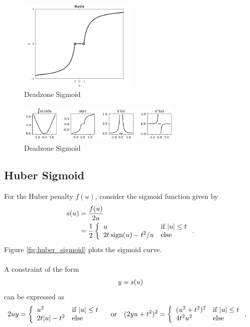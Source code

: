 \documentclass{article}
\begin{document}
        \begin{figure}[h!]
            \centering
            \includegraphics[width=0.5\textwidth]{./figs/nn/deadzone_sigmoid.png}
            \caption{Deadzone Sigmoid}
            \label{fig:deadzone_sigmoid}
        \end{figure}
        \begin{figure}[h!]
            \centering
            \includegraphics[width=0.7\textwidth]{./figs/nn/sig/deadzone.png}
            \caption{Deadzone Sigmoid}
            \label{fig:sig_deadzone}
        \end{figure}

\subsection{Huber Sigmoid}
    For the Huber penalty $f(u)$, 
    consider the sigmoid function given by
    \begin{align*}
        s(u)&=\frac{f(u)}{2u}\\
        &=\frac{1}{2}
        \left\{\begin{array}{lllllllllllllllllll}u & \text{if $|u|\leq t$} \\ 2t\:\text{sign}(u)-t^2/u & \text{else}\end{array}\right..
    \end{align*}
    Figure \ref{fig:huber_sigmoid} plots the sigmoid curve.\\
    \\
    A constraint of the form
    \begin{align*}
        y=s(u)
    \end{align*}
    can be expressed as
    \begin{align*}
        2uy&=
        \left\{\begin{array}{lllllllllllllllllll}u^2 & \text{if $|u|\leq t$} \\ 2t|u|-t^2 & \text{else}\end{array}\right.
        \quad\text{or}\quad
        (2yu+t^2)^2=
        \left\{\begin{array}{lllllllllllllllllll}(u^2+t^2)^2 & \text{if $|u|\leq t$} \\ 4t^2u^2 & \text{else}\end{array}\right.,
    \end{align*}
    
\end{document}
